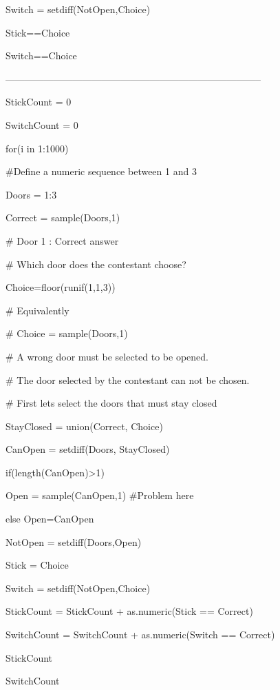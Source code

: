 Switch = setdiff(NotOpen,Choice)


Stick==Choice

Switch==Choice
 









--------------------------------------------------------------------------------





StickCount = 0

SwitchCount = 0


for(i in 1:1000)


{



#Define a numeric sequence between 1 and 3


Doors = 1:3 



Correct = sample(Doors,1)





# Door 1 :  Correct answer



# Which door does the contestant choose?


Choice=floor(runif(1,1,3))


# Equivalently

# Choice = sample(Doors,1)



# A wrong door must be selected to be opened. 

# The door selected by the contestant can not be chosen.

# First lets select the doors that must stay closed 


StayClosed = union(Correct, Choice)



CanOpen = setdiff(Doors, StayClosed)





if(length(CanOpen)>1)

{

Open = sample(CanOpen,1) #Problem here

}else {Open=CanOpen}


NotOpen = setdiff(Doors,Open)


Stick = Choice


Switch = setdiff(NotOpen,Choice)




StickCount = StickCount + as.numeric(Stick  ==  Correct)

SwitchCount = SwitchCount + as.numeric(Switch  ==  Correct)


}



StickCount

SwitchCount


